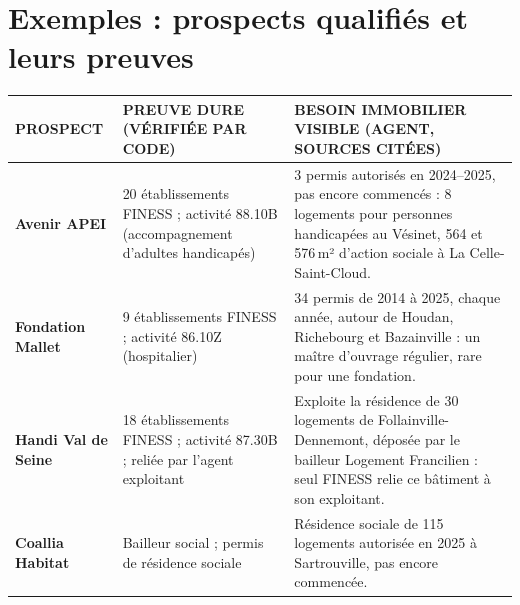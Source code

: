 \documentclass[10pt,a4paper]{article}
\begin{document}
\section{Exemples : prospects qualifiés et leurs preuves}
{\small
\begin{tabularx}{\linewidth}{@{}P{29mm}P{54mm}Y@{}}
\toprule
\textsf{\footnotesize\bfseries\color{gris}PROSPECT} & \textsf{\footnotesize\bfseries\color{gris}PREUVE DURE (VÉRIFIÉE PAR CODE)} & \textsf{\footnotesize\bfseries\color{gris}BESOIN IMMOBILIER VISIBLE (AGENT, SOURCES CITÉES)}\\
\midrule
\textbf{Avenir APEI} & 20 établissements FINESS ; activité 88.10B (accompagnement d'adultes handicapés) & 3 permis autorisés en 2024--2025, pas encore commencés : 8 logements pour personnes handicapées au Vésinet, 564 et 576\,m² d'action sociale à La Celle-Saint-Cloud.\\
\textbf{Fondation Mallet} & 9 établissements FINESS ; activité 86.10Z (hospitalier) & 34 permis de 2014 à 2025, chaque année, autour de Houdan, Richebourg et Bazainville : un maître d'ouvrage régulier, rare pour une fondation.\\
\textbf{Handi Val de Seine} & 18 établissements FINESS ; activité 87.30B ; reliée par l'agent exploitant & Exploite la résidence de 30 logements de Follainville-Dennemont, déposée par le bailleur Logement Francilien : seul FINESS relie ce bâtiment à son exploitant.\\
\textbf{Coallia Habitat} & Bailleur social ; permis de résidence sociale & Résidence sociale de 115 logements autorisée en 2025 à Sartrouville, pas encore commencée.\\
\bottomrule
\end{tabularx}}

\end{document}
